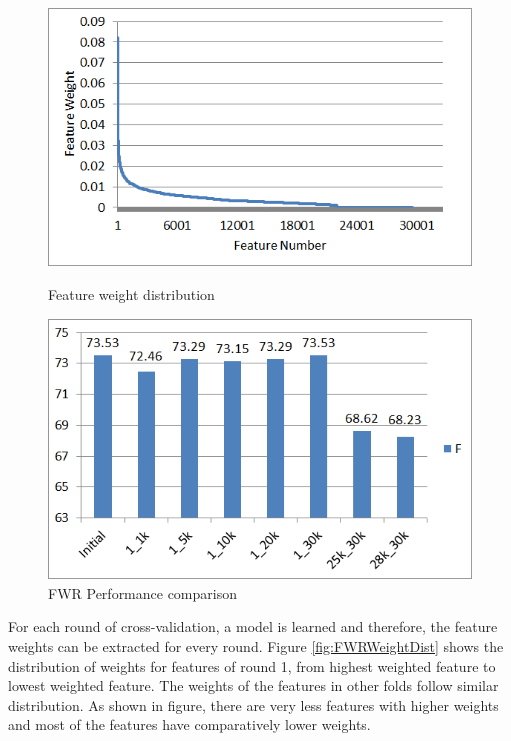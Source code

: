 \begin{figure}
\centering
\begin{minipage}{.5\textwidth}
  \centering
  \includegraphics[width=.95\textwidth]{figures/FWRWeightDist.png}
  \caption{Feature weight distribution}
  \label{fig:FWRWeightDist}
\end{minipage}%
\begin{minipage}{.5\textwidth}
  \centering
  \includegraphics[width=.95\textwidth]{figures/FWRPerformance.png}
  \caption{FWR Performance comparison}
  \label{fig:FWRPerfComp}
\end{minipage}
\end{figure}

For each round of cross-validation, a model is learned and therefore, the feature weights can be extracted for every round. Figure \ref{fig:FWRWeightDist} shows the distribution of weights for features of round 1, from highest weighted feature to lowest weighted feature. The weights of the features in other folds follow similar distribution. As shown in figure, there are very less features with higher weights and most of the features have comparatively lower weights.

